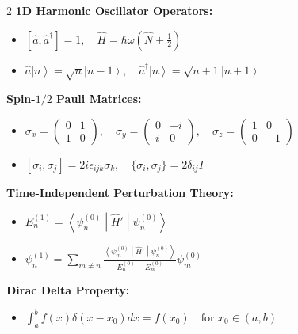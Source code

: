 \documentclass[11pt, a4paper, parskip=half]{scrartcl}
\newcommand{\ket}[1]{\left| #1 \right\rangle}
\newcommand{\mel}[3]{\left\langle #1 \middle| #2 \middle| #3 \right\rangle}
\begin{document}
\begin{tipbox}
\sffamily\small
\begin{multicols}{2}
\textbf{1D Harmonic Oscillator Operators:}
\begin{itemize}[leftmargin=10pt, itemsep=1pt]
  \item $[\hat{a}, \hat{a}^\dagger] = 1, \quad \hat{H} = \hbar\omega\left(\hat{N} + \frac{1}{2}\right)$
  \item $\hat{a}\ket{n} = \sqrt{n}\ket{n-1}, \quad \hat{a}^\dagger\ket{n} = \sqrt{n+1}\ket{n+1}$
\end{itemize}

\textbf{Spin-$1/2$ Pauli Matrices:}
\begin{itemize}[leftmargin=10pt, itemsep=1pt]
  \item $\sigma_x = \left(\begin{smallmatrix} 0&1\\1&0 \end{smallmatrix}\right), \quad \sigma_y = \left(\begin{smallmatrix} 0&-i\\i&0 \end{smallmatrix}\right), \quad \sigma_z = \left(\begin{smallmatrix} 1&0\\0&-1 \end{smallmatrix}\right)$
  \item $[\sigma_i, \sigma_j] = 2i\epsilon_{ijk}\sigma_k, \quad \{\sigma_i, \sigma_j\} = 2\delta_{ij}I$
\end{itemize}

\columnbreak

\textbf{Time-Independent Perturbation Theory:}
\begin{itemize}[leftmargin=10pt, itemsep=1pt]
  \item $E_n^{(1)} = \mel{\psi_n^{(0)}}{\hat{H}'}{\psi_n^{(0)}}$
  \item $\psi_n^{(1)} = \sum_{m \neq n} \frac{\mel{\psi_m^{(0)}}{\hat{H}'}{\psi_n^{(0)}}}{E_n^{(0)} - E_m^{(0)}} \psi_m^{(0)}$
\end{itemize}

\textbf{Dirac Delta Property:}
\begin{itemize}[leftmargin=10pt, itemsep=1pt]
  \item $\int_{a}^{b} f(x) \delta(x - x_0) dx = f(x_0) \quad \text{for } x_0 \in (a,b)$
\end{itemize}
\end{multicols}
\end{tipbox}
\end{document}
